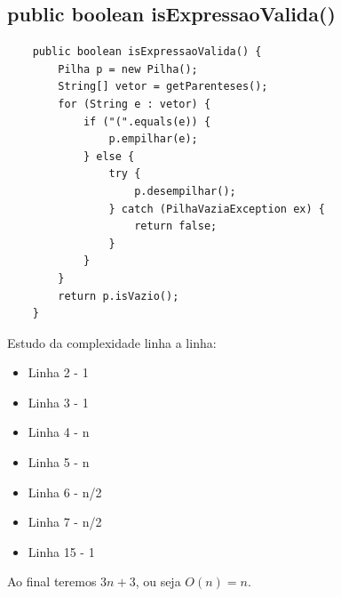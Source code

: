 \documentclass[a4paper,11pt]{article}
\begin{document}
\subsection{public boolean isExpressaoValida()}
\begin{lstlisting}
    public boolean isExpressaoValida() {
        Pilha p = new Pilha();
        String[] vetor = getParenteses();
        for (String e : vetor) {
            if ("(".equals(e)) {
                p.empilhar(e);
            } else {
                try {
                    p.desempilhar();
                } catch (PilhaVaziaException ex) {
                    return false;
                }
            }
        }
        return p.isVazio();
    }
\end{lstlisting}
Estudo da complexidade linha a linha:
\begin{itemize}
  \item Linha 2 - 1
  \item Linha 3 - 1
  \item Linha 4 - n
  \item Linha 5 - n
  \item Linha 6 - n/2
  \item Linha 7 - n/2
  \item Linha 15 - 1
\end{itemize}
Ao final teremos \(3n+3\), ou seja \(O(n)=n\).
\end{document}
